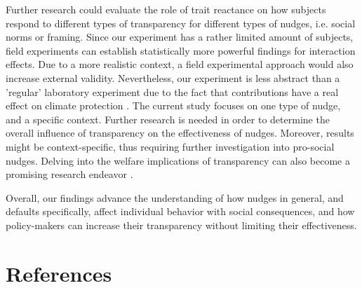 \documentclass[review, authoryear,12pt]{elsarticle}
\begin{document}
Further research could evaluate the role of trait reactance on how subjects respond to different types of transparency for different types of nudges, i.e. social norms or framing. Since our experiment has a rather limited amount of subjects, field experiments can establish statistically more powerful findings for interaction effects. Due to a more realistic context, a field experimental approach would also increase external validity. Nevertheless, our experiment is less abstract than a 'regular' laboratory experiment due to the fact that contributions have a real effect on climate protection \cite{Harrison.2004}. The current study focuses on one type of nudge, and a specific context. Further research is needed in order to determine the overall influence of transparency on the effectiveness of nudges. Moreover, results might be context-specific, thus requiring further investigation into pro-social nudges. Delving into the welfare implications of transparency can also become a promising research endeavor \citep{Sunstein.2015}.

Overall, our findings advance the understanding of how nudges in general, and defaults specifically, affect individual behavior with social consequences, and how policy-makers can increase their transparency without limiting their effectiveness.


\section*{References}





\clearpage
\end{document}

